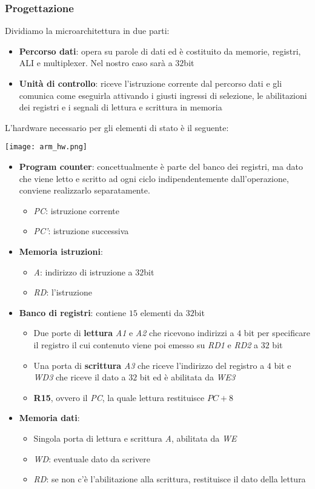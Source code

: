 \subsubsection{Progettazione}
Dividiamo la microarchitettura in due parti:
\begin{itemize}
	\item \textbf{Percorso dati}: opera su parole di dati ed è costituito da memorie, registri, ALI e multiplexer. Nel nostro caso sarà a $32$bit
	\item \textbf{Unità di controllo}: riceve l'istruzione corrente dal percorso dati e gli comunica come eseguirla attivando i giusti ingressi di selezione, le abilitazioni dei registri e i segnali di lettura e scrittura in memoria
\end{itemize}
L'hardware necessario per gli elementi di stato è il seguente:
\begin{center}
	\texttt{[image: arm\_hw.png]}
\end{center}
\begin{itemize}
	\item \textbf{Program counter}: concettualmente è parte del banco dei registri, ma dato che viene letto e scritto ad ogni ciclo indipendentemente dall'operazione, conviene realizzarlo separatamente.
	\begin{itemize}
		\item \textit{PC}: istruzione corrente
		\item \textit{PC'}: istruzione successiva
	\end{itemize}
	\item \textbf{Memoria istruzioni}:
	\begin{itemize}
		\item \textit{A}: indirizzo di istruzione a $32$bit
		\item \textit{RD}: l'istruzione
	\end{itemize}
	\item \textbf{Banco di registri}: contiene $15$ elementi da $32$bit
	\begin{itemize}
		\item Due porte di \textbf{lettura} \textit{A1} e \textit{A2} che ricevono indirizzi a $4$ bit per specificare il registro il cui contenuto viene poi emesso su \textit{RD1} e \textit{RD2} a $32$ bit
		\item Una porta di \textbf{scrittura} \textit{A3} che riceve l'indirizzo del registro a $4$ bit e \textit{WD3} che riceve il dato a $32$ bit ed è abilitata da \textit{WE3}
		\item \textbf{R15}, ovvero il \textit{PC}, la quale lettura restituisce $PC + 8$
	\end{itemize}
	\item \textbf{Memoria dati}:
	\begin{itemize}
		\item Singola porta di lettura e scrittura \textit{A}, abilitata da \textit{WE}
		\item \textit{WD}: eventuale dato da scrivere
		\item \textit{RD}: se non c'è l'abilitazione alla scrittura, restituisce il dato della lettura
	\end{itemize}
\end{itemize}

